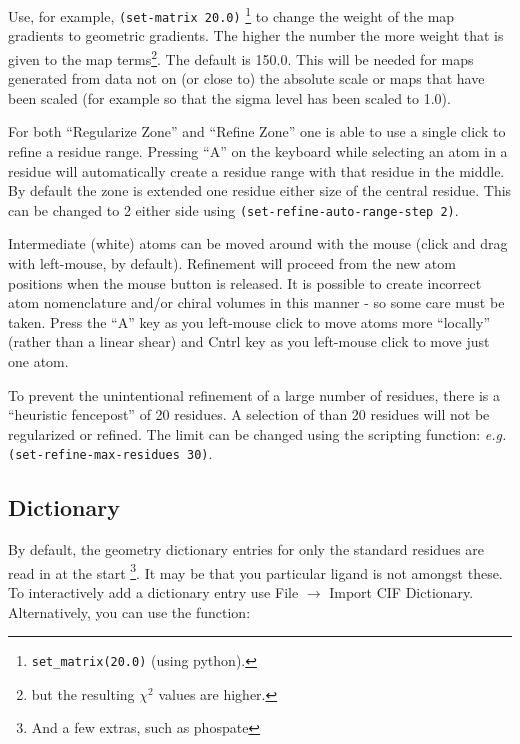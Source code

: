 \documentclass{book}
\begin{document}
Use, for example, \texttt{(set-matrix 20.0)}
\footnote{\texttt{set\_matrix(20.0)} (using python).} to change the
weight of the map gradients to geometric gradients.  The higher the
number the more weight that is given to the map terms\footnote{but the
  resulting $\chi^2$ values are higher.}.  The default is 150.0.  This
will be needed for maps generated from data not on (or close to) the
absolute scale or maps that have been scaled (for example so that
the sigma level has been scaled to 1.0).

For both ``Regularize Zone'' and ``Refine Zone'' one is able to use a
single click to refine a residue range.  Pressing ``A'' on the keyboard while
selecting an atom in a residue will automatically create a residue
range with that residue in the middle.  By default the zone is
extended one residue either size of the central residue.  This can be
changed to 2 either side using \texttt{(set-refine-auto-range-step
  2)}.

Intermediate (white) atoms can be moved around with the mouse (click
and drag with left-mouse, by default).   Refinement will proceed from the
new atom positions when the mouse button is released.  It is possible
to create incorrect atom nomenclature and/or chiral volumes in this
manner - so some care must be taken.  Press the ``A'' key as you
left-mouse click to move atoms more ``locally'' (rather than a linear
shear) and Cntrl key as you left-mouse click to move just one atom.

To prevent the unintentional refinement of a large number of residues,
there is a ``heuristic fencepost'' of 20 residues.  A selection of
than 20 residues will not be regularized or refined.  The limit can be
changed using the scripting function: \emph{e.g.}
\texttt{(set-refine-max-residues 30)}.

\subsection{Dictionary}
\label{cif-dictionary}By default, 
the geometry dictionary entries for only the standard
residues are read in at the start \footnote{And a few extras, such as
  phospate}.  It may be that you particular ligand is not amongst
these.  To interactively add a dictionary entry use \textsf{File
  $\rightarrow$ Import CIF Dictionary}.  Alternatively, you can use
the function:
\end{document}
